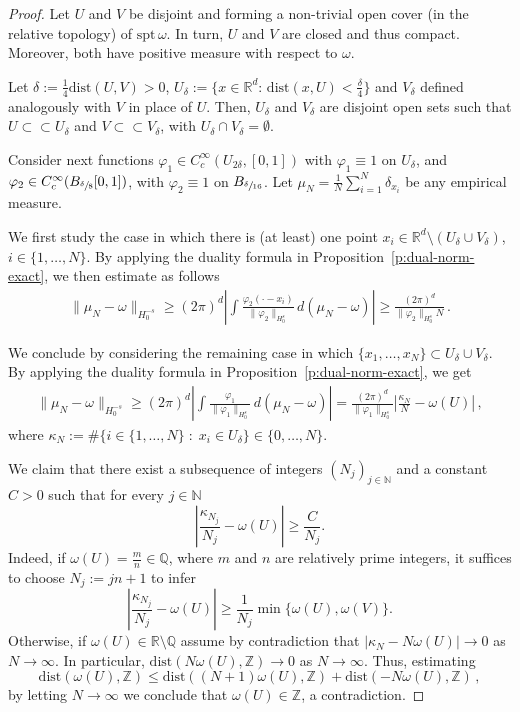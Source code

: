 \documentclass[12pt,a4paper,oneside]{amsart}
\theoremstyle{plain}
\theoremstyle{definition}
\numberwithin{equation}{section}
\numberwithin{figure}{section}
\numberwithin{table}{section}
\theoremstyle{remark}
\newcommand{\R}{\mathbb{R}}
\begin{document}
\begin{proof}
Let $U$ and $V$ be disjoint and forming a non-trivial open cover (in the relative topology) of $\mathrm{spt}\,\omega$. In turn, $U$ and $V$ are closed and thus compact. Moreover, both have positive measure with respect to $\omega$. 


Let $\delta:=\frac14\mathrm{dist}(U,V)>0$, 
$U_\delta:=\{x\in \R^d:\,\mathrm{dist}(x,U)<\frac\delta4\}$ and $V_\delta$ defined analogously with $V$ in place of $U$. Then, $U_\delta$ and 
$V_\delta$ are disjoint open sets such that $U\subset\subset U_\delta$
and $V\subset\subset V_\delta$, with $U_\delta\cap V_\delta=\emptyset$.

Consider next functions $\varphi_1\in C^\infty_c(U_{2\delta},[0,1])$ with 
$\varphi_1\equiv 1$ on $U_\delta$, and  $\varphi_2\in C^\infty_c(B_{\sfrac\delta8}[0,1])$, with $\varphi_2\equiv 1$ on $B_{\sfrac\delta{16}}$. 
Let $\mu_N=\frac1N\sum_{i=1}^N\delta_{x_i}$ be any empirical measure.

We first study the case in which there is (at least) one point 
$x_i\in \R^d\setminus (U_\delta\cup V_\delta)$, 
$i\in\{1,\ldots, N\}$. 
By applying the duality formula in Proposition~\ref{p:dual-norm-exact},
we then estimate as follows
\begin{align*}
\|\mu_N-\omega\|_{H_0^{-s}}
\ge (2\pi)^d\left|\int \frac{\varphi_2(\cdot-x_i)}{\|\varphi_2\|_{H_0^s}}\,d(\mu_N-\omega)\right|
\ge\frac{(2\pi)^d}{\|\varphi_2\|_{H_0^s}N}\,.
\end{align*}

We conclude by considering the remaining case in which $\{x_1,\ldots, x_N\}\subset U_\delta\cup V_\delta$.
By applying the duality formula in Proposition~\ref{p:dual-norm-exact},
we get
\begin{align*}
\|\mu_N-\omega\|_{H_0^{-s}}
\ge (2\pi)^d\left|\int \frac{\varphi_1}{\|\varphi_1\|_{H_0^s}}\,d(\mu_N-\omega)\right|
=\frac{(2\pi)^d}{\|\varphi_1\|_{H_0^s}}\left|\frac{\kappa_N}{N}-\omega(U)\right|\,,    
\end{align*}
where $\kappa_N:= \#\{i\in \{1,\dots, N\} \; : \; x_i\in U_\delta\}
\in\{0,\ldots,N\}$.

We claim that there exist a subsequence of integers $(N_j)_{j\in\mathbb N}$ and a constant $C>0$ such that for every $j\in\mathbb N$
\[
\left|\frac{\kappa_{N_j}}{N_j}-\omega(U)\right|\ge \frac{C}{N_j}.
\]
Indeed, if $\omega(U)=\frac{m}{n}\in\mathbb{Q}$, where $m$ and $n$ are relatively prime integers, it suffices to choose $N_j:=jn+1$ to infer 
\[
\left|\frac{\kappa_{N_j}}{N_j}-\omega(U)\right|\ge \frac{1}{N_j}\min\{\omega(U),\omega(V)\}.
\]
Otherwise, if $\omega(U)\in\mathbb{R}\setminus\mathbb{Q}$ assume by contradiction that $|\kappa_N-N\omega(U)|\to0$ as $N\to\infty$.
In particular, $\mathrm{dist}(N\omega(U),\mathbb{Z})\to0$ as $N\to\infty$.
Thus, estimating
\[
\mathrm{dist}(\omega(U),\mathbb{Z})\leq
\mathrm{dist}((N+1)\omega(U),\mathbb{Z})+
\mathrm{dist}(-N\omega(U),\mathbb{Z})\,,
\]
by letting $N\to\infty$ we conclude that $\omega(U)\in\mathbb{Z}$, a contradiction.
\end{proof}
\end{document}
